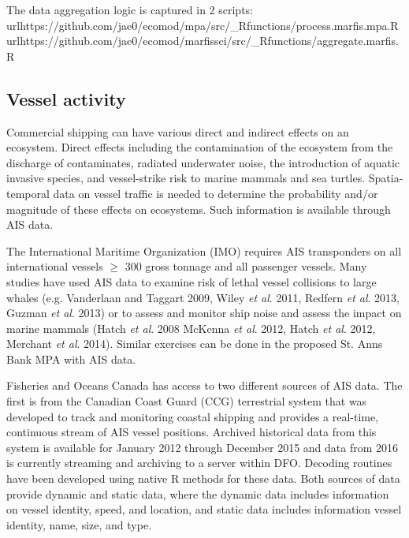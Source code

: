 \documentclass[letterpaper,portrait,11pt]{scrartcl}
\numberwithin{equation}{section}		%
\numberwithin{figure}{section}			%
\numberwithin{table}{section}				%
\begin{document}
The data aggregation logic is captured in 2 scripts: \\

url{https://github.com/jae0/ecomod/mpa/src/\_Rfunctions/process.marfis.mpa.R} \\
url{https://github.com/jae0/ecomod/marfissci/src/\_Rfunctions/aggregate.marfis.R}


\clearpage

\subsection{Vessel activity}
Commercial shipping can have various direct and indirect effects on an ecosystem. Direct effects including the contamination of the ecosystem from the discharge of contaminates, radiated underwater noise, the introduction of aquatic invasive species, and vessel-strike risk to marine mammals and sea turtles.  Spatia-temporal data on vessel traffic is needed to determine the probability and/or magnitude of these effects on ecosystems.  Such information is available through AIS data.  

The International Maritime Organization (IMO) requires AIS transponders on all international vessels $\geq$ 300 gross tonnage and all passenger vessels.  Many studies have used AIS data to examine risk of lethal vessel collisions to large whales (e.g. Vanderlaan and Taggart 2009, Wiley \textit{et al}. 2011, Redfern \textit{et al}. 2013,  Guzman \textit{et al}. 2013) or to assess and monitor ship noise and assess the impact on marine mammals (Hatch \textit{et al}. 2008 McKenna \textit{et al}. 2012,  Hatch \textit{et al}. 2012, Merchant \textit{et al}. 2014).    Similar exercises can be done in the proposed St. Anns Bank MPA with AIS data. 

Fisheries and Oceans Canada has access to two different sources of AIS data.  The first is from the Canadian Coast Guard (CCG) terrestrial system that was developed to track and monitoring coastal shipping and provides a real-time, continuous stream of AIS vessel positions.  Archived historical data from this system is available for January 2012 through December 2015 and data from 2016 is currently streaming and archiving to a server within DFO. Decoding routines have been developed using native R methods for these data.   Both sources of data provide dynamic and static data, where the dynamic data includes information on vessel identity, speed, and location, and static data includes information vessel identity, name, size, and type.   
\end{document}
